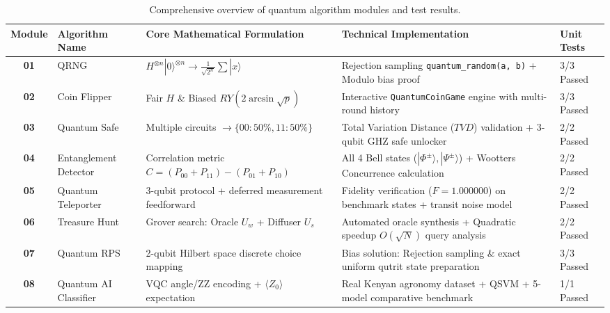 \documentclass[10pt,a4paper]{article}
\begin{document}
\begin{table}[H]
\centering
\scriptsize
\begin{tabular}{cllll}
\toprule
\textbf{Module} & \textbf{Algorithm Name} & \textbf{Core Mathematical Formulation} & \textbf{Technical Implementation} & \textbf{Unit Tests} \\
\midrule
\textbf{01} & QRNG & $H^{\otimes n}|0\rangle^{\otimes n} \to \frac{1}{\sqrt{2^n}}\sum |x\rangle$ & Rejection sampling \texttt{quantum\_random(a, b)} + Modulo bias proof & 3/3 Passed \\
\textbf{02} & Coin Flipper & Fair $H$ \& Biased $RY(2\arcsin\sqrt{p})$ & Interactive \texttt{QuantumCoinGame} engine with multi-round history & 3/3 Passed \\
\textbf{03} & Quantum Safe & Multiple circuits $\to \{00: 50\%, 11: 50\%\}$ & Total Variation Distance ($TVD$) validation + 3-qubit GHZ safe unlocker & 2/2 Passed \\
\textbf{04} & Entanglement Detector & Correlation metric $C = (P_{00}+P_{11}) - (P_{01}+P_{10})$ & All 4 Bell states ($|\Phi^\pm\rangle, |\Psi^\pm\rangle$) + Wootters Concurrence calculation & 2/2 Passed \\
\textbf{05} & Quantum Teleporter & 3-qubit protocol + deferred measurement feedforward & Fidelity verification ($F=1.000000$) on benchmark states + transit noise model & 2/2 Passed \\
\textbf{06} & Treasure Hunt & Grover search: Oracle $U_w$ + Diffuser $U_s$ & Automated oracle synthesis + Quadratic speedup $O(\sqrt{N})$ query analysis & 2/2 Passed \\
\textbf{07} & Quantum RPS & 2-qubit Hilbert space discrete choice mapping & Bias solution: Rejection sampling \& exact uniform qutrit state preparation & 3/3 Passed \\
\textbf{08} & Quantum AI Classifier & VQC angle/ZZ encoding + $\langle Z_0\rangle$ expectation & Real Kenyan agronomy dataset + QSVM + 5-model comparative benchmark & 1/1 Passed \\
\bottomrule
\end{tabular}
\caption{Comprehensive overview of quantum algorithm modules and test results.}
\end{table}
\end{document}
